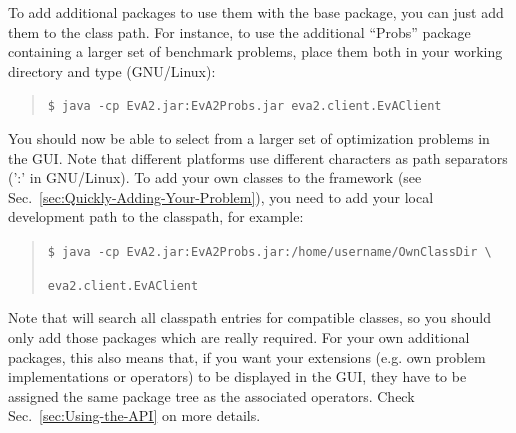To add additional packages to use them with the  base package,
you can just add them to the class path. For instance, to use the
additional ``Probs'' package containing a larger set of benchmark
problems, place them both in your working directory and type (GNU/Linux):
\begin{quotation}
\texttt{\small \$ java -cp EvA2.jar:EvA2Probs.jar eva2.client.EvAClient}{\small \par}
\end{quotation}
You should now be able to select from a larger set of optimization
problems in the GUI. Note that different platforms use different characters
as path separators (':' in GNU/Linux). To add your own classes to
the  framework (see Sec.~\ref{sec:Quickly-Adding-Your-Problem}),
you need to add your local development path to the classpath, for
example:
\begin{quotation}
\texttt{\small \$ java -cp EvA2.jar:EvA2Probs.jar:/home/username/OwnClassDir
\textbackslash{}}{\small \par}

\texttt{\small eva2.client.EvAClient}{\small \par}
\end{quotation}
Note that  will search all classpath entries for compatible
classes, so you should only add those packages which are really required.
For your own additional packages, this also means that, if you want
your extensions (e.g. own problem implementations or operators) to
be displayed in the  GUI, they have to be assigned the
same package tree as the associated  operators. Check Sec.~\ref{sec:Using-the-API}
on more details.